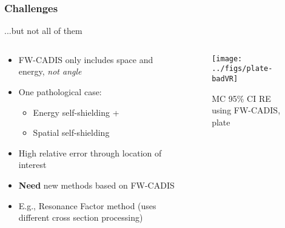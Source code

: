 \documentclass[xcolor=x11names,compress]{beamer}
\renewcommand{\(}{\begin{columns}}
\renewcommand{\)}{\end{columns}}
\newcommand{\<}[1]{\begin{column}{#1}}
\renewcommand{\>}{\end{column}}
\begin{document}
\begin{frame}[fragile]
  \frametitle{Challenges}

	...but not all of them
	\begin{columns}
  	\begin{column}{0.5\textwidth}
  	\begin{center}
		\begin{itemize}
		\item FW-CADIS only includes space and energy, 
			\textit{not angle}
		\item One pathological case:
		\begin{itemize}
		\item Energy self-shielding +
		\item Spatial self-shielding
		\end{itemize}
		\item High relative error through location of interest
		\item \textbf{Need} new methods based on FW-CADIS
		\item E.g., Resonance Factor method (uses different cross section processing)
		\end{itemize}
	\end{center}
  	\end{column}
 	\begin{column}{0.5\textwidth}
  	\begin{center}
  	\begin{figure}
  		\texttt{[image: ../figs/plate-badVR]}
  		\caption{MC 95\% CI RE using FW-CADIS, plate \cite{Wilson2015}}
  	\end{figure}
  	\end{center}
  	\end{column}
	\end{columns}
  
\end{frame}


\end{document}
